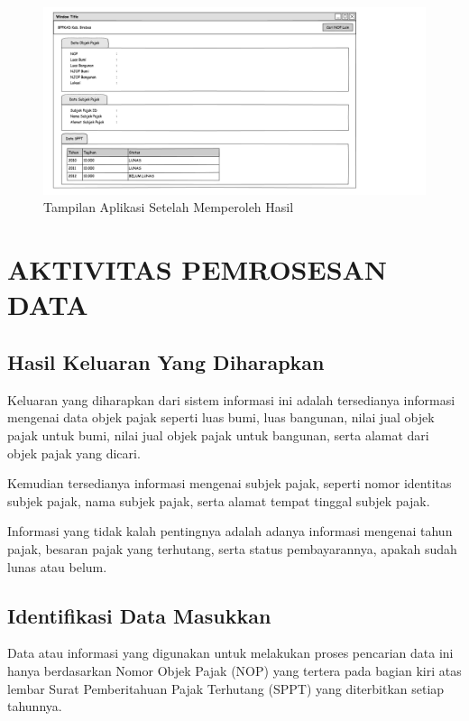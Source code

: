 \documentclass[pdftex,12pt, oneside]{article}
\begin{document}
\begin{figure}[H]
	\centering
	\includegraphics[width=1\textwidth]{./resources/content_page}
	\caption{Tampilan Aplikasi Setelah Memperoleh Hasil}
	\label{fig:ui-2}
\end{figure}

\section{AKTIVITAS PEMROSESAN DATA}

\subsection{Hasil Keluaran Yang Diharapkan}

Keluaran yang diharapkan dari sistem informasi ini adalah tersedianya informasi mengenai data objek pajak seperti luas bumi, luas bangunan, nilai jual objek pajak untuk bumi, nilai jual objek pajak untuk bangunan, serta alamat dari objek pajak yang dicari.

Kemudian tersedianya informasi mengenai subjek pajak, seperti nomor identitas subjek pajak, nama subjek pajak, serta alamat tempat tinggal subjek pajak.

Informasi yang tidak kalah pentingnya adalah adanya informasi mengenai tahun pajak, besaran pajak yang terhutang, serta status pembayarannya, apakah sudah lunas atau belum.

\subsection{Identifikasi Data Masukkan}

Data atau informasi yang digunakan untuk melakukan proses pencarian data ini hanya berdasarkan Nomor Objek Pajak (NOP) yang tertera pada bagian kiri atas lembar Surat Pemberitahuan Pajak Terhutang (SPPT) yang diterbitkan setiap tahunnya.
\end{document}

